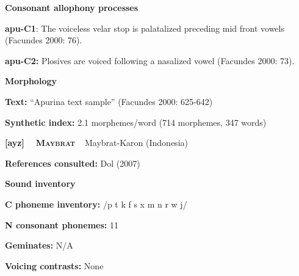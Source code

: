 \begin{styleBody}
\textbf{Consonant allophony processes}
\end{styleBody}

\begin{styleBody}
\textbf{apu-C1}: The voiceless velar stop is palatalized preceding mid front vowels (Facundes 2000: 76).
\end{styleBody}

\begin{styleBody}
\textbf{apu-C2: }Plosives are voiced following a nasalized vowel (Facundes 2000: 73).
\end{styleBody}

\begin{styleBody}
\textbf{Morphology}
\end{styleBody}

\begin{styleBody}
\textbf{Text:} “Apurina text sample” (Facundes 2000: 625-642)
\end{styleBody}

\begin{styleBody}
\textbf{Synthetic index: }2.1 morphemes/word (714 morphemes, 347 words)
\end{styleBody}

\clearpage\begin{styleBody}
\textbf{[ayz] }\ \ \textbf{\textsc{Maybrat}}\textbf{\ \ }Maybrat-Karon (Indonesia)
\end{styleBody}

\begin{styleBody}
\textbf{References consulted: }Dol (2007)
\end{styleBody}

\begin{styleBody}
\textbf{Sound inventory}
\end{styleBody}

\begin{styleBody}
\textbf{C phoneme inventory:} /p t k f s x m n r w j/
\end{styleBody}

\begin{styleBody}
\textbf{N consonant phonemes:} 11
\end{styleBody}

\begin{styleBody}
\textbf{Geminates:} N/A
\end{styleBody}

\begin{styleBody}
\textbf{Voicing contrasts:} None
\end{styleBody}

